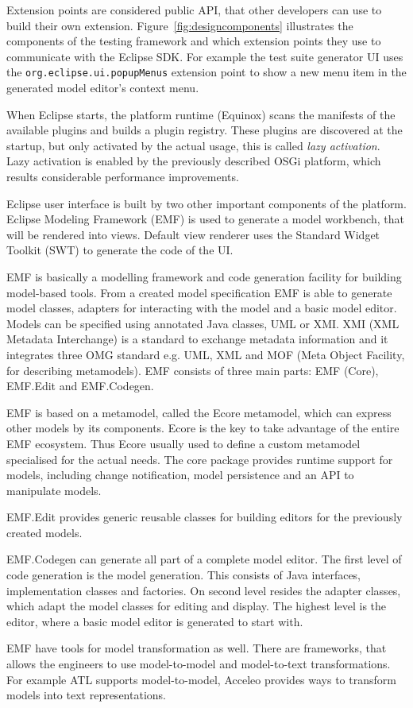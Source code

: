 Extension points are considered public API, that other developers can use to build their own extension. Figure~\ref{fig:designcomponents} illustrates the components of the testing framework and which extension points they use to communicate with the Eclipse SDK. For example the test suite generator UI uses the \texttt{org.eclipse.ui.popupMenus} extension point to show a new menu item in the generated model editor's context menu.

When Eclipse starts, the platform runtime (Equinox) scans the manifests of the available plugins and builds a plugin registry. These plugins are discovered at the startup, but only activated by the actual usage, this is called \textit{lazy activation}. Lazy activation is enabled by the previously described OSGi platform, which results considerable performance improvements.

Eclipse user interface is built by two other important components of the platform. Eclipse Modeling Framework (EMF) is used to generate a model workbench, that will be rendered into views. Default view renderer uses the Standard Widget Toolkit (SWT) to generate the code of the UI.

EMF is basically a modelling framework and code generation facility for building model-based tools. From a created model specification EMF is able to generate model classes, adapters for interacting with the model and a basic model editor.  Models can be specified using annotated Java classes, UML or XMI. XMI (XML Metadata Interchange) is a standard to exchange metadata information and it integrates three OMG standard e.g. UML, XML and MOF (Meta Object Facility, for describing metamodels). EMF consists of three main parts: EMF (Core), EMF.Edit and EMF.Codegen.

EMF is based on a metamodel, called the Ecore metamodel, which can express other models by its components. Ecore is the key to take advantage of the entire EMF ecosystem. Thus Ecore usually used to define a custom metamodel specialised for the actual needs. The core package provides runtime support for models, including change notification, model persistence and an API to manipulate models.

EMF.Edit provides generic reusable classes for building editors for the previously created models.

EMF.Codegen can generate all part of a complete model editor. The first level of code generation is the model generation. This consists of Java interfaces, implementation classes and factories. On second level resides the adapter classes, which adapt the model classes for editing and display. The highest level is the editor, where a basic model editor is generated to start with.

EMF have tools for model transformation as well. There are frameworks, that allows the engineers to use model-to-model and model-to-text transformations. For example ATL supports model-to-model, Acceleo \cite{acceleo} provides ways to transform models into text representations.



